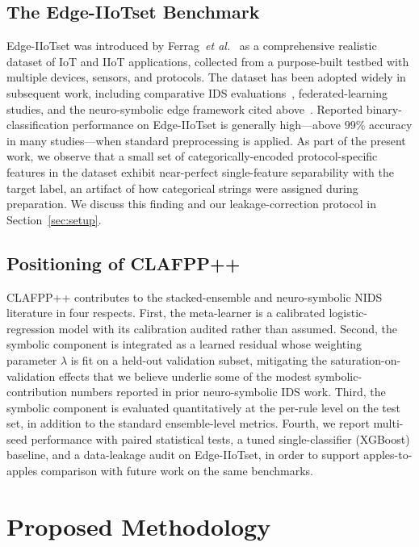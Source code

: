 \documentclass[pdflatex,sn-mathphys-num]{sn-jnl}
\theoremstyle{thmstyleone}
\theoremstyle{thmstyletwo}
\theoremstyle{thmstylethree}
\begin{document}
\subsection{The Edge-IIoTset Benchmark}
Edge-IIoTset was introduced by Ferrag~\textit{et al.}~\cite{ferrag2022edge} as a comprehensive realistic dataset of IoT and IIoT applications, collected from a purpose-built testbed with multiple devices, sensors, and protocols. The dataset has been adopted widely in subsequent work, including comparative IDS evaluations~\cite{tareq2023comparative}, federated-learning studies, and the neuro-symbolic edge framework cited above~\cite{neurosymbolic2026sensors}. Reported binary-classification performance on Edge-IIoTset is generally high---above $99\%$ accuracy in many studies---when standard preprocessing is applied. As part of the present work, we observe that a small set of categorically-encoded protocol-specific features in the dataset exhibit near-perfect single-feature separability with the target label, an artifact of how categorical strings were assigned during preparation. We discuss this finding and our leakage-correction protocol in Section~\ref{sec:setup}.

\subsection{Positioning of CLAFPP++}
CLAFPP++ contributes to the stacked-ensemble and neuro-symbolic NIDS literature in four respects. First, the meta-learner is a calibrated logistic-regression model with its calibration audited rather than assumed. Second, the symbolic component is integrated as a learned residual whose weighting parameter $\lambda$ is fit on a held-out validation subset, mitigating the saturation-on-validation effects that we believe underlie some of the modest symbolic-contribution numbers reported in prior neuro-symbolic IDS work. Third, the symbolic component is evaluated quantitatively at the per-rule level on the test set, in addition to the standard ensemble-level metrics. Fourth, we report multi-seed performance with paired statistical tests, a tuned single-classifier (XGBoost) baseline, and a data-leakage audit on Edge-IIoTset, in order to support apples-to-apples comparison with future work on the same benchmarks.

\section{Proposed Methodology}\label{sec:method}
\end{document}
